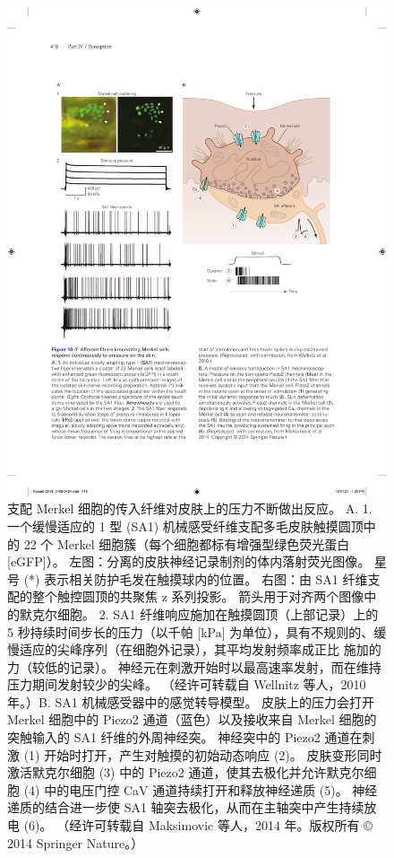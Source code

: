 \begin{figure}[htbp]
	\centering
	\includegraphics[width=1.0\linewidth]{chap18/fig_18_7}
	\caption{支配 Merkel 细胞的传入纤维对皮肤上的压力不断做出反应。 
		A. 1. 一个缓慢适应的 1 型 (SA1) 机械感受纤维支配多毛皮肤触摸圆顶中的 22 个 Merkel 细胞簇（每个细胞都标有增强型绿色荧光蛋白 [eGFP]）。 
		左图：分离的皮肤神经记录制剂的体内落射荧光图像。 
		星号 (*) 表示相关防护毛发在触摸球内的位置。 
		右图：由 SA1 纤维支配的整个触控圆顶的共聚焦 z 系列投影。 
		箭头用于对齐两个图像中的默克尔细胞。 
		2. SA1 纤维响应施加在触摸圆顶（上部记录）上的 5 秒持续时间步长的压力（以千帕 [kPa] 为单位），具有不规则的、缓慢适应的尖峰序列（在细胞外记录），其平均发射频率成正比 施加的力（较低的记录）。 
		神经元在刺激开始时以最高速率发射，而在维持压力期间发射较少的尖峰。 （经许可转载自 Wellnitz 等人，2010 年。）B. SA1 机械感受器中的感觉转导模型。 
		皮肤上的压力会打开 Merkel 细胞中的 Piezo2 通道（蓝色）以及接收来自 Merkel 细胞的突触输入的 SA1 纤维的外周神经突。 
		神经突中的 Piezo2 通道在刺激 (1) 开始时打开，产生对触摸的初始动态响应 (2)。 
		皮肤变形同时激活默克尔细胞 (3) 中的 Piezo2 通道，使其去极化并允许默克尔细胞 (4) 中的电压门控 CaV 通道持续打开和释放神经递质 (5)。 
		神经递质的结合进一步使 SA1 轴突去极化，从而在主轴突中产生持续放电 (6)。 （经许可转载自 Maksimovic 等人，2014 年。版权所有 © 2014 Springer Nature。）}
	\label{fig:18_7}
\end{figure}

